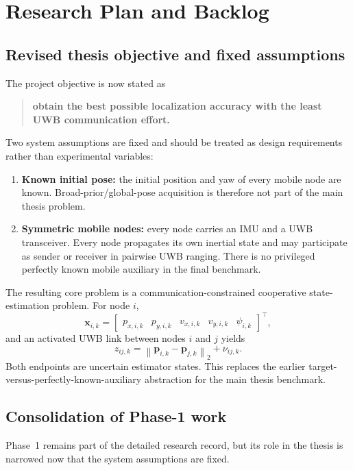 \chapter{Research Plan and Backlog}

\section{Revised thesis objective and fixed assumptions}
The project objective is now stated as
\begin{quote}
\textbf{obtain the best possible localization accuracy with the least UWB communication effort.}
\end{quote}
Two system assumptions are fixed and should be treated as design requirements rather than experimental variables:
\begin{enumerate}
    \item \textbf{Known initial pose:} the initial position and yaw of every mobile node are known. Broad-prior/global-pose acquisition is therefore not part of the main thesis problem.
    \item \textbf{Symmetric mobile nodes:} every node carries an IMU and a UWB transceiver. Every node propagates its own inertial state and may participate as sender or receiver in pairwise UWB ranging. There is no privileged perfectly known mobile auxiliary in the final benchmark.
\end{enumerate}

The resulting core problem is a communication-constrained cooperative state-estimation problem. For node \(i\),
\begin{equation}
    \bm{x}_{i,k}
    =
    \begin{bmatrix}
        p_{x,i,k} & p_{y,i,k} & v_{x,i,k} & v_{y,i,k} & \psi_{i,k}
    \end{bmatrix}^{\top},
\end{equation}
and an activated UWB link between nodes \(i\) and \(j\) yields
\begin{equation}
    z_{ij,k}
    =
    \left\|\bm{p}_{i,k}-\bm{p}_{j,k}\right\|_2+\nu_{ij,k}.
\end{equation}
Both endpoints are uncertain estimator states. This replaces the earlier target-versus-perfectly-known-auxiliary abstraction for the main thesis benchmark.

\section{Consolidation of Phase-1 work}
Phase~1 remains part of the detailed research record, but its role in the thesis is narrowed now that the system assumptions are fixed.

